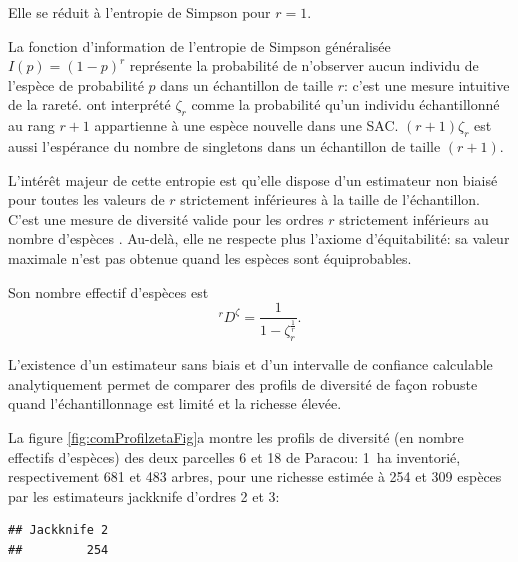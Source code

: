 \documentclass[
  11pt,
  french,
  a4paper,
  extrafontsizes,onecolumn,openright
  ]{memoir}
\newenvironment{Shaded}{\begin{snugshade}}{\end{snugshade}}
\newcommand{\DataTypeTok}[1]{\textcolor[rgb]{0.13,0.29,0.53}{#1}}
\newcommand{\DecValTok}[1]{\textcolor[rgb]{0.00,0.00,0.81}{#1}}
\newcommand{\KeywordTok}[1]{\textcolor[rgb]{0.13,0.29,0.53}{\textbf{#1}}}
\newcommand{\NormalTok}[1]{#1}
\newcommand{\OperatorTok}[1]{\textcolor[rgb]{0.81,0.36,0.00}{\textbf{#1}}}
\newcommand{\StringTok}[1]{\textcolor[rgb]{0.31,0.60,0.02}{#1}}
\begin{document}
Elle se réduit à l'entropie de Simpson pour \(r=1\).

La fonction d'information de l'entropie de Simpson généralisée \(I(p)=(1-p)^r\) représente la probabilité de n'observer aucun individu de l'espèce de probabilité \(p\) dans un échantillon de taille \(r\): c'est une mesure intuitive de la rareté.
\textcite{Chao2013} ont interprété \(\zeta_r\) comme la probabilité qu'un individu échantillonné au rang \(r+1\) appartienne à une espèce nouvelle dans une SAC.
\((r+1)\zeta_r\) est aussi l'espérance du nombre de singletons dans un échantillon de taille \((r+1)\).

L'intérêt majeur de cette entropie est qu'elle dispose d'un estimateur non biaisé pour toutes les valeurs de \(r\) strictement inférieures à la taille de l'échantillon.
C'est une mesure de diversité valide pour les ordres \(r\) strictement inférieurs au nombre d'espèces \autocite{Grabchak2016}.
Au-delà, elle ne respecte plus l'axiome d'équitabilité: sa valeur maximale n'est pas obtenue quand les espèces sont équiprobables.

Son nombre effectif d'espèces est
\begin{equation}
  \label{eq:Dzeta}
  ^{r}\!D^{\zeta} = \frac{1}{1 - \zeta_r^{\frac{1}{r}}}.
\end{equation}

L'existence d'un estimateur sans biais et d'un intervalle de confiance calculable analytiquement permet de comparer des profils de diversité de façon robuste quand l'échantillonnage est limité et la richesse élevée.

La figure \ref{fig:comProfilzetaFig}a montre les profils de diversité (en nombre effectifs d'espèces) des deux parcelles 6 et 18 de Paracou: 1~ha inventorié, respectivement 681 et 483 arbres, pour une richesse estimée à 254 et 309 espèces par les estimateurs jackknife d'ordres 2 et 3:

\scriptsize

\begin{Shaded}
\end{Shaded}

\begin{verbatim}
## Jackknife 2 
##         254
\end{verbatim}
\end{document}
